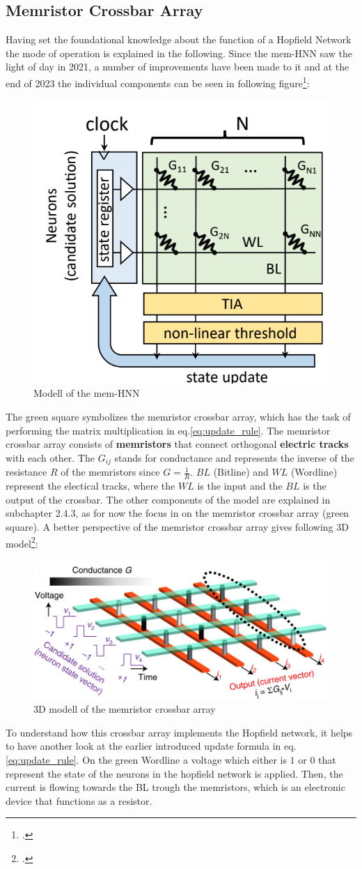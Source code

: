 \subsection{Memristor Crossbar Array}

Having set the foundational knowledge about the function of a Hopfield Network the mode of operation is explained in the following. 
Since the \ac{mem-HNN} saw the light of day in 2021, a number of improvements have been made to it and at the end of 2023 the individual components can be seen in following figure\footcite[cf.][2]{hizzaniMemristorbasedHardwareAlgorithms2023}:
\begin{figure}[H]
    \centering
    \includegraphics[width=0.3\linewidth]{graphics/Mem_HNN_Modell.png}
    \caption{Modell of the mem-HNN}
    \label{ModellHMM}
\end{figure}
The green square symbolizes the memristor crossbar array, which has the task of performing the matrix multiplication in eq.\eqref{eq:update_rule}. 
The memristor crossbar array consists of \textbf{memristors} that connect orthogonal \textbf{electric tracks} with each other.
The \( G_{ij} \) stands for conductance and represents the inverse of the resistance \( R \) of the memristors since \( G = \frac{1}{R}\).
\( BL \) (Bitline) and \( WL \) (Wordline) represent the electical tracks, where the \( WL \) is the input and the \( BL \) is the output of the crossbar.
The other components of the model are explained in subchapter 2.4.3, as for now the focus in on the memristor crossbar array (green square).
A better perspective of the memristor crossbar array gives following 3D model\footcite[cf.][410]{caiPowerefficientCombinatorialOptimization2020}:
\begin{figure}[H]
    \centering
    \includegraphics[width=0.65\linewidth]{graphics/memristor_crossbar_array.png}
    \caption{3D modell of the memristor crossbar array}
\end{figure}
To understand how this crossbar array implements the Hopfield network, it helps to have another look at the earlier introduced update formula in eq.\eqref{eq:update_rule}.
On the green Wordline a voltage which either is \( 1 \) or \( 0 \) that represent the state of the neurons in the hopfield network is applied.
Then, the current is flowing towards the BL trough the memristors, which is an electronic device that functions as a resistor.

